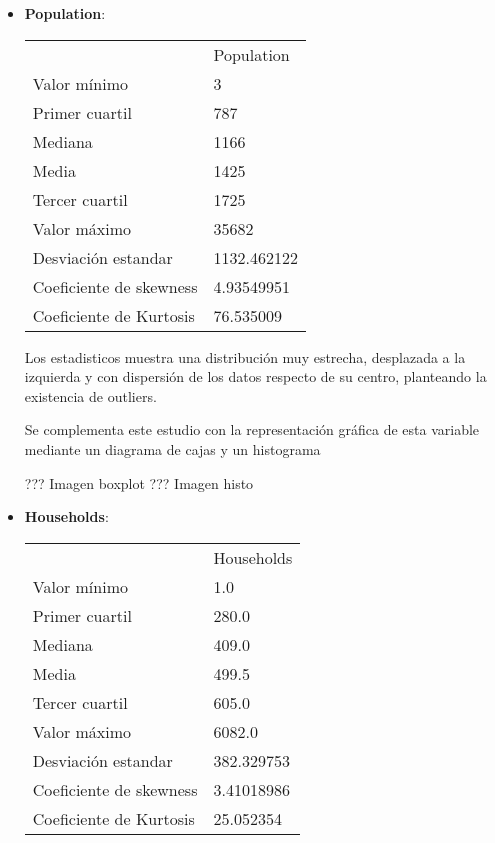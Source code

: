 {\begin{itemize}
	
	\item \textbf{Population}: 
	\begin{table}[]
		\begin{tabular}{ll}
			& Population  \\
			Valor mínimo            & 3           \\
			Primer cuartil          & 787         \\
			Mediana                 & 1166        \\
			Media                   & 1425        \\
			Tercer cuartil          & 1725        \\
			Valor máximo            & 35682       \\ \hline
			Desviación estandar     & 1132.462122 \\ \hline
			Coeficiente de skewness & 4.93549951  \\
			Coeficiente de Kurtosis & 76.535009  
		\end{tabular}
	\end{table}

Los estadisticos muestra una distribución muy estrecha, desplazada a la izquierda y con dispersión de los datos respecto de su centro, planteando la existencia de outliers.

Se complementa este estudio con la representación gráfica de esta variable mediante un diagrama de cajas y un histograma

??? Imagen boxplot
??? Imagen histo

	
	\item \textbf{Households}: 
	\begin{table}[]
		\begin{tabular}{ll}
			& Households \\
			Valor mínimo            & 1.0        \\
			Primer cuartil          & 280.0      \\
			Mediana                 & 409.0      \\
			Media                   & 499.5      \\
			Tercer cuartil          & 605.0      \\
			Valor máximo            & 6082.0     \\ \hline
			Desviación estandar     & 382.329753 \\ \hline
			Coeficiente de skewness & 3.41018986 \\
			Coeficiente de Kurtosis & 25.052354 
		\end{tabular}
	\end{table}


\end{itemize}}
